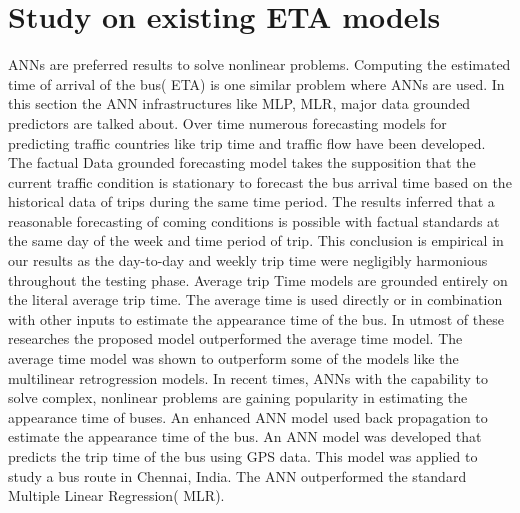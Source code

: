 \section{Study on existing ETA models}
ANNs are preferred results to solve nonlinear problems. Computing the estimated time of arrival of the bus( ETA) is one similar problem where ANNs are used. In this section the ANN infrastructures like MLP, MLR, major data grounded predictors are talked about. 
Over time numerous forecasting models for predicting traffic countries like trip time and traffic flow have been developed. The factual Data grounded forecasting model takes the supposition that the current traffic condition is stationary to forecast the bus arrival time based on the historical data of trips during the same time period. The results inferred that a reasonable forecasting of coming conditions is possible with factual standards at the same day of the week and time period of trip. This conclusion is empirical in our results as the day-to-day and weekly trip time were negligibly harmonious throughout the testing phase. Average trip Time models are grounded entirely on the literal average trip time. The average time is used directly or in combination with other inputs to estimate the appearance time of the bus. In utmost of these researches the proposed model outperformed the average time model. The average time model was shown to outperform some of the models like the multilinear retrogression models. In recent times, ANNs with the capability to solve complex, nonlinear problems are gaining popularity in estimating the appearance time of buses. An enhanced ANN model used back propagation to estimate the appearance time of the bus. An ANN model was developed that predicts the trip time of the bus using GPS data. This model was applied to study a bus route in Chennai, India. The ANN outperformed the standard Multiple Linear Regression( MLR).

